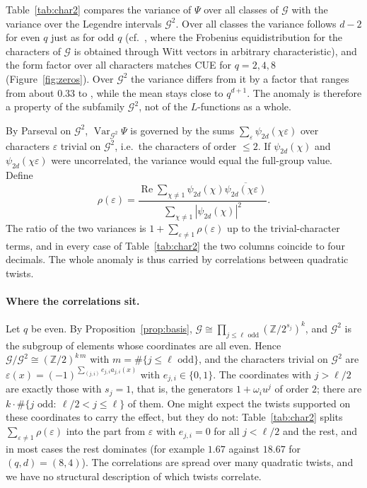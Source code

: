 \documentclass[11pt,a4paper]{article}
\theoremstyle{definition}
\theoremstyle{remark}
\newcommand{\cG}{\mathcal{G}}
\newcommand{\Var}{\operatorname{Var}}
\begin{document}
Table~\ref{tab:char2} compares the variance of $\Psi$ over all classes of $\cG$ with the variance over the
Legendre intervals $\cG^2$. Over all classes the variance follows $d-2$ for even $q$ just as for odd $q$
(cf.\ \cite{Katz2013}, where the Frobenius equidistribution for the characters of $\cG$ is obtained
through Witt vectors in arbitrary characteristic),
and the form factor over all characters matches CUE for $q=2,4,8$ (Figure~\ref{fig:zeros}). Over $\cG^2$
the variance differs from it by a factor that ranges from about $0.33$ to \MaxExcess, while the mean
stays close to $q^{d+1}$. The anomaly is therefore a property of the subfamily $\cG^2$, not of the
$L$-functions as a whole.

By Parseval on $\cG^2$, $\Var_{\cG^2}\Psi$ is governed by the sums $\sum_{\varepsilon}\psi_{2d}(\chi\varepsilon)$ over
characters $\varepsilon$ trivial on $\cG^2$, i.e.\ the characters of order $\le2$. If $\psi_{2d}(\chi)$ and
$\psi_{2d}(\chi\varepsilon)$ were uncorrelated, the variance would equal the full-group value. Define
\begin{equation}\label{eq:rho}
 \rho(\varepsilon)=\frac{\operatorname{Re}\sum_{\chi\ne1}\psi_{2d}(\chi)\overline{\psi_{2d}(\chi\varepsilon)}}{\sum_{\chi\ne1}|\psi_{2d}(\chi)|^2}.
\end{equation}
The ratio of the two variances is $1+\sum_{\varepsilon\ne1}\rho(\varepsilon)$ up to the trivial-character terms, and
in every case of Table~\ref{tab:char2} the two columns coincide to four decimals. The whole anomaly is
thus carried by correlations between quadratic twists.

\paragraph{Where the correlations sit.}
Let $q$ be even. By Proposition~\ref{prop:basis}, $\cG\cong\prod_{j\le\ell\text{ odd}}(\mathbb Z/2^{s_j})^k$, and
$\cG^2$ is the subgroup of elements whose coordinates are all even. Hence $\cG/\cG^2\cong(\mathbb Z/2)^{k\,m}$
with $m=\#\{j\le\ell\text{ odd}\}$, and the characters trivial on $\cG^2$ are
$\varepsilon(x)=(-1)^{\sum_{(j,i)}e_{j,i}a_{j,i}(x)}$ with $e_{j,i}\in\{0,1\}$. The coordinates with $j>\ell/2$
are exactly those with $s_j=1$, that is, the generators $1+\omega_iu^j$ of order $2$; there are
$k\cdot\#\{j\text{ odd}:\ \ell/2<j\le\ell\}$ of them. One might expect the twists supported on these
coordinates to carry the effect, but they do not: Table~\ref{tab:char2} splits $\sum_{\varepsilon\ne1}\rho(\varepsilon)$ into
the part from $\varepsilon$ with $e_{j,i}=0$ for all $j<\ell/2$ and the rest, and in most cases the rest dominates
(for example $1.67$ against $18.67$ for $(q,d)=(8,4)$). The correlations are spread over many quadratic twists,
and we have no structural description of which twists correlate.
\end{document}

